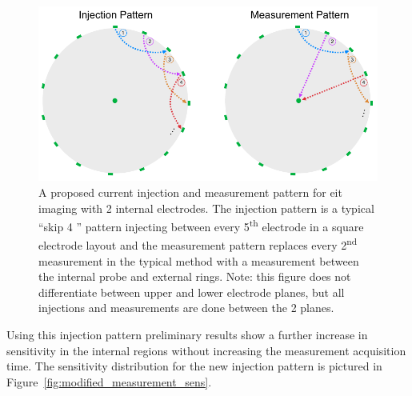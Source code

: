 \begin{figure}
\centering
\includegraphics[width=\textwidth]{chapter6-internal_electrodes/imgs/current_injection.pdf}
\caption[Current injection patterns with internal electrodes]{A proposed current injection and measurement pattern for \acrshort{eit} imaging with 2 internal electrodes.
The injection pattern is a typical ``skip 4 '' pattern injecting between every 5\textsuperscript{th} electrode in a square electrode layout and the
measurement pattern replaces every 2\textsuperscript{nd} measurement in the typical method with a measurement between the internal probe and
external rings. Note: this figure does not differentiate between upper and lower electrode planes, but all injections and measurements are done between 
the 2 planes.}
\label{fig:modified_measurement}
\end{figure}

Using this injection pattern preliminary results show a further increase in sensitivity in the internal regions without increasing the measurement
acquisition time. The sensitivity distribution for the new injection pattern is pictured in Figure~\ref{fig:modified_measurement_sens}.

